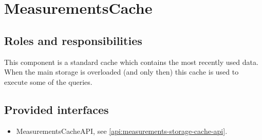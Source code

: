\section{MeasurementsCache}
\label{element:measurements-cache-api}

\subsection{Roles and responsibilities}

\npar This component is a standard cache which contains the most recently used
data. When the main storage is overloaded (and only then) this cache is used to
execute some of the queries. 

\subsection{Provided interfaces}

\begin{itemize}
  \item MeasurementsCacheAPI, see \ref{api:measurements-storage-cache-api}.
\end{itemize}
